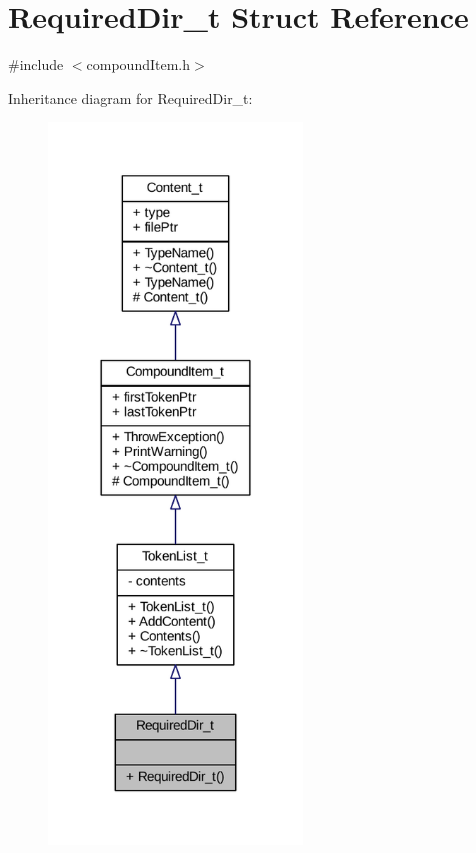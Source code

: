 \hypertarget{struct_required_dir__t}{}\section{Required\+Dir\+\_\+t Struct Reference}
\label{struct_required_dir__t}


{\ttfamily \#include $<$compound\+Item.\+h$>$}



Inheritance diagram for Required\+Dir\+\_\+t\+:
\nopagebreak
\begin{figure}[H]
\begin{center}
\leavevmode
\includegraphics[width=191pt]{struct_required_dir__t__inherit__graph}
\end{center}
\end{figure}


